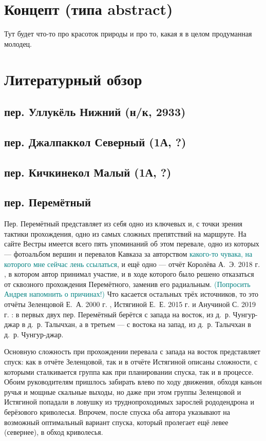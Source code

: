 \documentclass[a4paper, 12pt]{report}
\begin{document}

\tableofcontents



\section{Концепт (типа abstract)} 
Тут будет что-то про красоток природы и про то, какая я в целом продуманная молодец.
\section{Литературный обзор}

\subsection{пер. Уллукёль Нижний (н/к, 2933)} 
\subsection{пер. Джалпаккол Северный (1А, ?)} 
\subsection{пер. Кичкинекол Малый (1А, ?)} 
\subsection{пер. Перемётный} 
Пер. Перемётный представляет из себя одно из ключевых и, с точки зрения тактики прохождения, одно из самых сложных препятствий на маршруте. На сайте Вестры \cite{WestraCat} имеется всего пять упоминаний об этом перевале, одно из которых — фотоальбом вершин и перевалов Кавказа за авторством \textcolor{teal}{какого-то чувака, на которого мне сейчас лень ссылаться}, и ещё одно — отчёт Королёва А.~Э. 2018 г. \cite{Korolyov2018}, в котором автор принимал участие, и в ходе которого было решено отказаться от сквозного прохождения Перемётного, заменив его радиальным. \textcolor{teal}{(Попросить Андрея напомнить о причинах!)} Что касается остальных трёх источников, то это отчёты Зеленцовой Е.~А. 2000 г. \cite{Zelentsova2000}, Истягиной Е.~Е. 2015 г. и Анучиной С. 2019 г. \cite{Anuchina2019}: в первых двух пер. Перемётный берётся с запада на восток, из д.~р. Чунгур-джар в д.~р. Талычхан, а в третьем --- с востока на запад, из д.~р. Талычхан в д.~р. Чунгур-джар. 

Основную сложность при прохождении перевала с запада на восток представляет спуск: как в отчёте Зеленцовой, так и в отчёте Истягиной описаны сложности, с которыми сталкивается группа как при планировании спуска, так и в процессе. Обоим руководителям пришлось забирать влево по ходу движения, обходя каньон ручья и мощные скальные выходы, но даже при этом группы Зеленцовой и Истягиной попадали в ловушку из труднопроходимых зарослей рододендрона и берёзового криволесья. Впрочем, после спуска оба автора указывают на возможный оптимальный вариант спуска, который пролегает ещё левее (севернее), в обход криволесья. 
\end{document}
